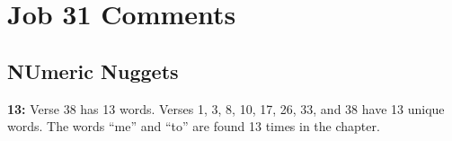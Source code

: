 \section{Job 31  Comments}

\subsection{NUmeric Nuggets}
\textbf{13:} Verse 38 has 13 words. Verses 1, 3, 8, 10, 17, 26, 33, and 38 have 13 unique words. The words ``me'' and ``to'' are found 13 times in the chapter.